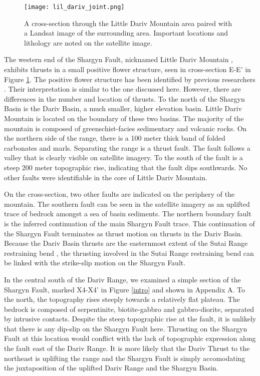 \begin{figure}[p!]
  \centering
  \texttt{[image: lil\_dariv\_joint.png]}
  \caption{A cross-section through the Little Dariv Mountain area paired with a Landsat image of the surrounding area. Important locations and lithology are noted on the satellite image.}
  \label{lil_dariv_joint}
\end{figure}
\clearpage
The western end of the Shargyn Fault, nicknamed Little Dariv Mountain \citep{Howard2006}, exhibits thrusts in a small positive flower structure, seen in cross-section E-E' in Figure \ref{lil_dariv_joint}. The positive flower structure has been identified by previous researchers \citep{Howard2006}. Their interpretation is similar to the one discussed here. However, there are differences in the number and location of thrusts. To the north of the Shargyn Basin is the Dariv Basin, a much smaller, higher elevation basin. Little Dariv Mountain is located on the boundary of these two basins. The majority of the mountain is composed of greenschist-facies sedimentary and volcanic rocks. On the northern side of the range, there is a 100 meter thick band of folded carbonates and marls. Separating the range is a thrust fault. The fault follows a valley that is clearly visible on satellite imagery. To the south of the fault is a steep 200 meter topographic rise, indicating that the fault dips southwards. No other faults were identifiable in the core of Little Dariv Mountain. 

On the cross-section, two other faults are indicated on the periphery of the mountain. The southern fault can be seen in the satellite imagery as an uplifted trace of bedrock amongst a sea of basin sediments. The northern boundary fault is the inferred continuation of the main Shargyn Fault trace.  This continuation of the Shargyn Fault terminates as thrust motion on thrusts in the Dariv Basin. Because the Dariv Basin thrusts are the easternmost extent of the Sutai Range restraining bend \citep{Cunningham2003}, the thrusting involved in the Sutai Range restraining bend can be linked with the strike-slip motion on the Shargyn Fault. 

In the central south of the Dariv Range, we examined a simple section of the Shargyn Fault, marked X4-X4' in Figure \ref{intro} and shown in Appendix A. To the north, the topography rises steeply towards a relatively flat plateau. The bedrock is composed of serpentinite, biotite-gabbro and gabbro-diorite, separated by intrusive contacts. Despite the steep topographic rise at the fault, it is unlikely that there is any dip-slip on the Shargyn Fault here. Thrusting on the Shargyn Fault at this location would conflict with the lack of topographic expression along the fault east of the Dariv Range. It is more likely that the Dariv Thrust to the northeast is uplifting the range and the Shargyn Fault is simply accomodating the juxtaposition of the uplifted Dariv Range and the Shargyn Basin. 

